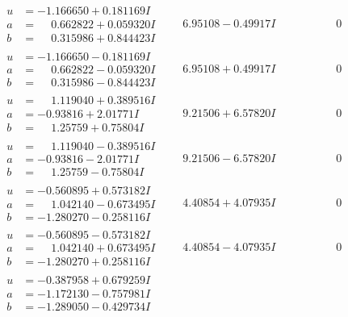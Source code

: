 \documentclass[1p]{elsarticle_modified}
\theoremstyle{definition}
\begin{document}
$$\begin{array}{c|c|c}
\begin{aligned}
u &= -1.166650 + 0.181169 I \\
a &= \phantom{-}0.662822 + 0.059320 I \\
b &= \phantom{-}0.315986 + 0.844423 I\end{aligned}
 & \phantom{-}6.95108 - 0.49917 I & \phantom{-0.000000 } 0 \\ \hline\begin{aligned}
u &= -1.166650 - 0.181169 I \\
a &= \phantom{-}0.662822 - 0.059320 I \\
b &= \phantom{-}0.315986 - 0.844423 I\end{aligned}
 & \phantom{-}6.95108 + 0.49917 I & \phantom{-0.000000 } 0 \\ \hline\begin{aligned}
u &= \phantom{-}1.119040 + 0.389516 I \\
a &= -0.93816 + 2.01771 I \\
b &= \phantom{-}1.25759 + 0.75804 I\end{aligned}
 & \phantom{-}9.21506 + 6.57820 I & \phantom{-0.000000 } 0 \\ \hline\begin{aligned}
u &= \phantom{-}1.119040 - 0.389516 I \\
a &= -0.93816 - 2.01771 I \\
b &= \phantom{-}1.25759 - 0.75804 I\end{aligned}
 & \phantom{-}9.21506 - 6.57820 I & \phantom{-0.000000 } 0 \\ \hline\begin{aligned}
u &= -0.560895 + 0.573182 I \\
a &= \phantom{-}1.042140 - 0.673495 I \\
b &= -1.280270 - 0.258116 I\end{aligned}
 & \phantom{-}4.40854 + 4.07935 I & \phantom{-0.000000 } 0 \\ \hline\begin{aligned}
u &= -0.560895 - 0.573182 I \\
a &= \phantom{-}1.042140 + 0.673495 I \\
b &= -1.280270 + 0.258116 I\end{aligned}
 & \phantom{-}4.40854 - 4.07935 I & \phantom{-0.000000 } 0 \\ \hline\begin{aligned}
u &= -0.387958 + 0.679259 I \\
a &= -1.172130 - 0.757981 I \\
b &= -1.289050 - 0.429734 I\end{aligned}

\end{array}$$
\end{document}
